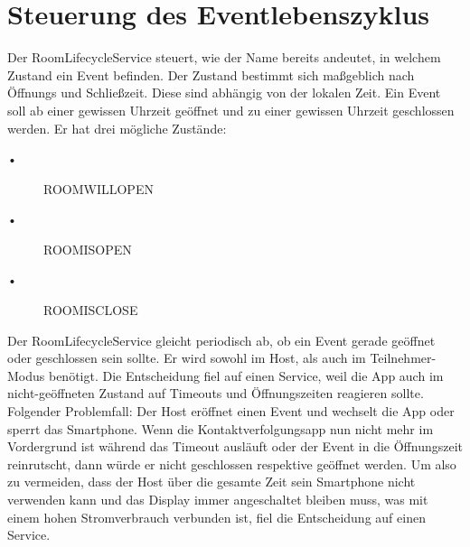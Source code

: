 \section{Steuerung des Eventlebenszyklus}
\label{sec:RoomLifecycleService}
Der RoomLifecycleService steuert, wie der Name bereits andeutet, in welchem Zustand ein Event befinden.
 Der Zustand bestimmt sich maßgeblich nach Öffnungs und Schließzeit.
Diese sind abhängig von der lokalen Zeit. Ein Event soll ab einer gewissen Uhrzeit geöffnet und zu einer gewissen Uhrzeit geschlossen werden. 
Er hat drei mögliche Zustände:
\begin{description}
\item[•] ROOMWILLOPEN
\item[•] ROOMISOPEN
\item[•] ROOMISCLOSE
\end{description}

Der RoomLifecycleService gleicht periodisch ab, ob ein Event gerade geöffnet oder geschlossen sein sollte.
Er wird sowohl im Host, als auch im Teilnehmer-Modus benötigt. 
Die Entscheidung fiel auf einen Service, weil die App auch im nicht-geöffneten Zustand auf Timeouts und Öffnungszeiten reagieren sollte.
Folgender Problemfall: Der Host eröffnet einen Event und wechselt die App oder sperrt das Smartphone. 
Wenn die Kontaktverfolgungsapp nun nicht mehr im Vordergrund ist während das Timeout ausläuft oder der Event in die Öffnungszeit reinrutscht, dann würde er nicht geschlossen respektive geöffnet werden. 
Um also zu vermeiden, dass der Host über die gesamte Zeit sein Smartphone nicht verwenden kann und das Display immer angeschaltet bleiben muss, was mit einem hohen Stromverbrauch verbunden ist, fiel die Entscheidung auf einen Service.


